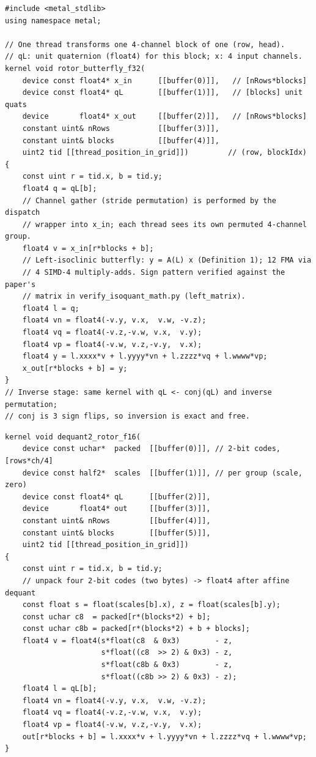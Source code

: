\documentclass{article}
\begin{document}
\begin{lstlisting}[language=MSL,caption={Rotary-butterfly stage (left-rotor variant), MSL 3.1.}]
#include <metal_stdlib>
using namespace metal;

// One thread transforms one 4-channel block of one (row, head).
// qL: unit quaternion (float4) for this block; x: 4 input channels.
kernel void rotor_butterfly_f32(
    device const float4* x_in      [[buffer(0)]],   // [nRows*blocks]
    device const float4* qL        [[buffer(1)]],   // [blocks] unit quats
    device       float4* x_out     [[buffer(2)]],   // [nRows*blocks]
    constant uint& nRows           [[buffer(3)]],
    constant uint& blocks          [[buffer(4)]],
    uint2 tid [[thread_position_in_grid]])         // (row, blockIdx)
{
    const uint r = tid.x, b = tid.y;
    float4 q = qL[b];
    // Channel gather (stride permutation) is performed by the dispatch
    // wrapper into x_in; each thread sees its own permuted 4-channel group.
    float4 v = x_in[r*blocks + b];
    // Left-isoclinic butterfly: y = A(L) x (Definition 1); 12 FMA via
    // 4 SIMD-4 multiply-adds. Sign pattern verified against the paper's
    // matrix in verify_isoquant_math.py (left_matrix).
    float4 l = q;
    float4 vn = float4(-v.y, v.x,  v.w, -v.z);
    float4 vq = float4(-v.z,-v.w, v.x,  v.y);
    float4 vp = float4(-v.w, v.z,-v.y,  v.x);
    float4 y = l.xxxx*v + l.yyyy*vn + l.zzzz*vq + l.wwww*vp;
    x_out[r*blocks + b] = y;
}
// Inverse stage: same kernel with qL <- conj(qL) and inverse permutation;
// conj is 3 sign flips, so inversion is exact and free.
\end{lstlisting}

\begin{lstlisting}[language=MSL,caption={Fused 2-bit dequant + rotor butterfly for the KV path.}]
kernel void dequant2_rotor_f16(
    device const uchar*  packed  [[buffer(0)]], // 2-bit codes, [rows*ch/4]
    device const half2*  scales  [[buffer(1)]], // per group (scale, zero)
    device const float4* qL      [[buffer(2)]],
    device       float4* out     [[buffer(3)]],
    constant uint& nRows         [[buffer(4)]],
    constant uint& blocks        [[buffer(5)]],
    uint2 tid [[thread_position_in_grid]])
{
    const uint r = tid.x, b = tid.y;
    // unpack four 2-bit codes (two bytes) -> float4 after affine dequant
    const float s = float(scales[b].x), z = float(scales[b].y);
    const uchar c8  = packed[r*(blocks*2) + b];
    const uchar c8b = packed[r*(blocks*2) + b + blocks];
    float4 v = float4(s*float(c8  & 0x3)        - z,
                      s*float((c8  >> 2) & 0x3) - z,
                      s*float(c8b & 0x3)        - z,
                      s*float((c8b >> 2) & 0x3) - z);
    float4 l = qL[b];
    float4 vn = float4(-v.y, v.x,  v.w, -v.z);
    float4 vq = float4(-v.z,-v.w, v.x,  v.y);
    float4 vp = float4(-v.w, v.z,-v.y,  v.x);
    out[r*blocks + b] = l.xxxx*v + l.yyyy*vn + l.zzzz*vq + l.wwww*vp;
}
\end{lstlisting}
\end{document}
